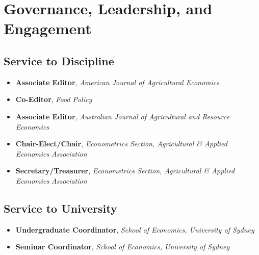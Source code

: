 \documentclass[10pt]{article}
\begin{document}
	\bigskip
	
	\section*{Governance, Leadership, and Engagement}
	
	\subsection*{Service to Discipline}
	\begin{itemize}
		\item {} \textbf{Associate Editor}, \textsl{American Journal of Agricultural Economics}
		\item {} \textbf{Co-Editor}, \textsl{Food Policy}
		\item {} \textbf{Associate Editor}, \textsl{Australian Journal of Agricultural and Resource Economics}
		\item {} \textbf{Chair-Elect/Chair}, \textsl{Econometrics Section, Agricultural \& Applied Economics Association}
		\item {} \textbf{Secretary/Treasurer}, \textsl{Econometrics Section, Agricultural \& Applied Economics Association}
	\end{itemize}
	
	\subsection*{Service to University}
	\begin{itemize}
		\item {} \textbf{Undergraduate Coordinator}, \textsl{School of Economics, University of Sydney}
		\item {} \textbf{Seminar Coordinator}, \textsl{School of Economics, University of Sydney}
	\end{itemize}
	
\end{document}
